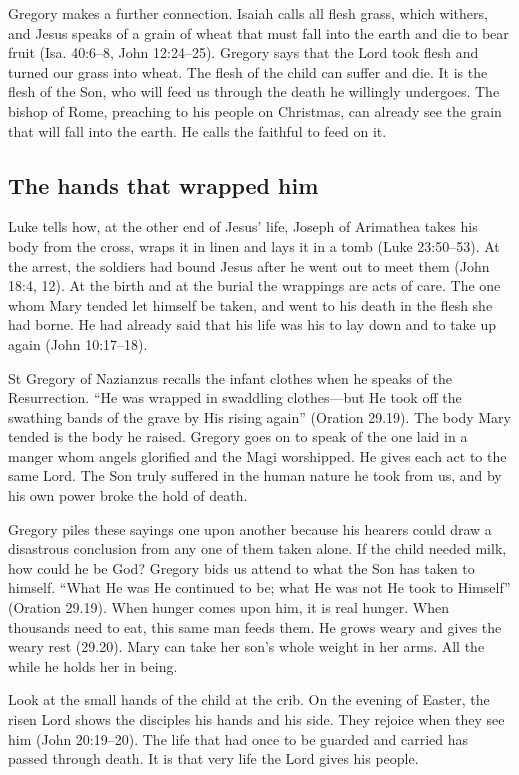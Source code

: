 Gregory makes a further connection. Isaiah calls all flesh grass, which
withers, and Jesus speaks of a grain of wheat that must fall into the
earth and die to bear fruit (Isa. 40:6--8, John 12:24--25). Gregory says
that the Lord took flesh and turned our grass into wheat. The flesh of
the child can suffer and die. It is the flesh of the Son, who will feed
us through the death he willingly undergoes. The bishop of Rome, preaching
to his people on Christmas, can already see the grain that will fall into
the earth. He calls the faithful to feed on it.

\subsection{The hands that wrapped him}

Luke tells how, at the other end of Jesus' life, Joseph of Arimathea takes
his body from the cross, wraps it in linen and lays it in a tomb (Luke
23:50--53). At the arrest, the soldiers had bound Jesus after he went out
to meet them (John 18:4, 12). At the birth and at the burial the
wrappings are acts of care. The one whom Mary tended let himself be taken,
and went to his death in the flesh she had borne. He had already said
that his life was his to lay down and to take up again (John
10:17--18).

St Gregory of Nazianzus recalls the infant clothes when he speaks of the
Resurrection. “He was wrapped in swaddling clothes—but He took off the
swathing bands of the grave by His rising again” (Oration 29.19). The
body Mary tended is the body he raised. Gregory goes on to speak of the
one laid in a manger whom angels glorified and the Magi worshipped.
He gives each act to the same Lord. The Son truly suffered in the human
nature he took from us, and by his own power broke the hold of death.

Gregory piles these sayings one upon another because his hearers
could draw a disastrous conclusion from any one of them taken alone.
If the child needed milk, how could he be God? Gregory bids us attend
to what the Son has taken to himself. “What He was He continued to
be; what He was not He took to Himself” (Oration 29.19). When hunger
comes upon him, it is real hunger. When thousands need to eat, this
same man feeds them. He grows weary and gives the weary rest (29.20).
Mary can take her son's whole weight in her arms. All the while he
holds her in being.

Look at the small hands of the child at the crib. On the evening of Easter,
the risen Lord shows the disciples his hands and his side. They rejoice
when they see him (John 20:19--20). The life that had once to be guarded and
carried has passed through death. It is that very life the Lord gives his
people.

